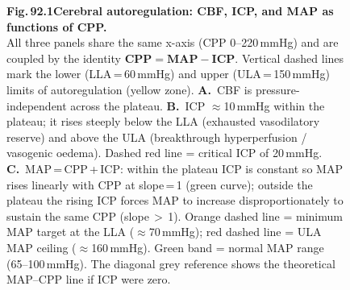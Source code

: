 \documentclass[12pt]{article}
\begin{document}
\begin{figure}[p]
\medskip
\noindent\textbf{Fig.\,92.1\quad Cerebral autoregulation: CBF, ICP, and MAP as functions of CPP.}\\[3pt]
\small
All three panels share the same x-axis (CPP 0–220\,mmHg) and are coupled by the identity
\(\mathbf{CPP = MAP - ICP}\).
Vertical dashed lines mark the lower (LLA\,=\,60\,mmHg) and upper (ULA\,=\,150\,mmHg)
limits of autoregulation (yellow zone).
\textbf{A.}~CBF is pressure-independent across the plateau.
\textbf{B.}~ICP \(\approx\)10\,mmHg within the plateau; it rises steeply below the LLA
(exhausted vasodilatory reserve) and above the ULA (breakthrough hyperperfusion /
vasogenic oedema). Dashed red line = critical ICP of 20\,mmHg.
\textbf{C.}~MAP\,=\,CPP\,+\,ICP: within the plateau ICP is constant so MAP rises linearly
with CPP at slope\,=\,1 (green curve); outside the plateau the rising ICP forces MAP to
increase disproportionately to sustain the same CPP (slope\,\(>\)\,1).
Orange dashed line = minimum MAP target at the LLA (\(\approx\)70\,mmHg);
red dashed line = ULA MAP ceiling (\(\approx\)160\,mmHg).
Green band = normal MAP range (65–100\,mmHg).
The diagonal grey reference shows the theoretical MAP–CPP line if ICP were zero.

\end{figure}
\end{document}
